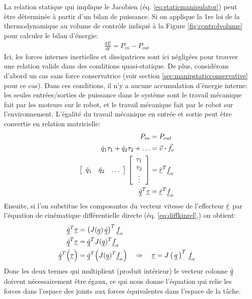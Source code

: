 La relation statique qui implique le Jacobien (éq. \eqref{eq:staticmanipulator}) peut être déterminée à partir d'un bilan de puissance. Si on applique la 1re loi de la thermodynamique au volume de contrôle indiqué à la Figure \ref{fig:controlvolume} pour calculer le bilan d'énergie:
\begin{align}
	\frac{dE}{dt} = P_{in} - P_{out}
\end{align}
Ici, les forces internes inertielles et dissipatrices sont ici négligées pour trouver une relation valide dans des conditions quasi-statique. De plus, considérons d'abord un cas sans force conservatrice (voir section \ref{sec:manipstaticconservative} pour ce cas). Dans ces conditions, il n'y a aucune accumulation d'énergie interne: les seules entrées/sorties de puissance dans le système sont le travail mécanique fait par les moteurs sur le robot, et le travail mécanique fait par le robot sur l'environnement. L'égalité du travail mécanique en entrée et sortie peut être convertie en relation matricielle:
\begin{align}
	P_{in} &= P_{out} \\
	\dot{q}_1 \tau_1  + \dot{q}_2 \tau_2 + \hdots  &= \Vec{v} \boldsymbol{\cdot} \Vec{f}_e \\
	\left[ \begin{array}{c c c}
			   \dot{q}_1 & \dot{q}_2 & \hdots
	\end{array} \right] \,
	\left[ \begin{array}{c}
			   \tau_1 \\ \tau_2 \\ \vdots
	\end{array} \right] &= \underline{\dot{r}}^T \underline{f}_e \\
	\underline{\dot{q}}^T \underline{\tau} &= \underline{\dot{r}}^T \underline{f}_e \\
\end{align}
Ensuite, si l'on substitue les composantes du vecteur vitesse de l'effecteur $\underline{\dot{r}}$ par l'équation de cinématique différentielle directe (éq. \eqref{eq:diffkinrel},) on obtient:
\begin{align}
	\underline{\dot{q}}^T \underline{\tau} &= \left( J( \underline{q}) \,  \underline{\dot{q}}  \right)^T \underline{f}_e \\
	\underline{\dot{q}}^T \underline{\tau} &= \underline{\dot{q}}^T  J( \underline{q})^T \underline{f}_e    \\
	\underline{\dot{q}}^T \Big( \underline{\tau} \Big) &= \underline{\dot{q}}^T  \Big( J( \underline{q})^T \underline{f}_e \Big)
	\quad \Rightarrow \quad \underline{\tau} = J\left( \, \underline{q} \, \right)^T \, \underline{f}_e
\end{align}
Donc les deux termes qui multiplient (produit intérieur) le vecteur colonne $\underline{\dot{q}}$ doivent nécessairement être égaux, ce qui nous donne l'équation qui relie les forces dans l'espace des joints aux forces équivalentes dans l'espace de la tâche.



